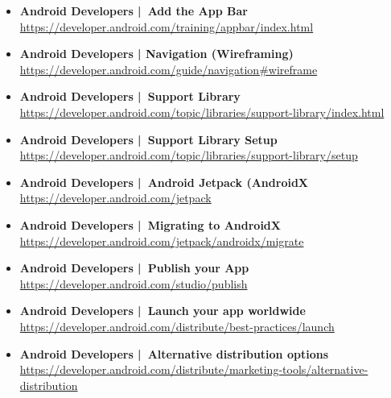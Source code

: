 \documentclass[a4paper]{article}
\begin{document}
\begin{itemize}
		\item \textbf{Android Developers | Add the App Bar}\\
		\href{https://developer.android.com/training/appbar/index.html}
		{https://developer.android.com/training/appbar/index.html}
		
		\item \textbf{Android Developers | Navigation (Wireframing)}\\
		\href{https://developer.android.com/guide/navigation#wireframe}
		{https://developer.android.com/guide/navigation\#wireframe}
		
		\item \textbf{Android Developers | Support Library}\\
		\href{https://developer.android.com/topic/libraries/support-library/index.html}
		{https://developer.android.com/topic/libraries/support-library/index.html}
		
		\item \textbf{Android Developers | Support Library Setup}\\
		\href{https://developer.android.com/topic/libraries/support-library/setup}
		{https://developer.android.com/topic/libraries/support-library/setup}
		
		\item \textbf{Android Developers | Android Jetpack (AndroidX}\\
		\href{https://developer.android.com/jetpack}
		{https://developer.android.com/jetpack}
		
		\item \textbf{Android Developers | Migrating to AndroidX}\\
		\href{https://developer.android.com/jetpack/androidx/migrate}
		{https://developer.android.com/jetpack/androidx/migrate}
		
		\item \textbf{Android Developers | Publish your App}\\
		\href{https://developer.android.com/studio/publish}
		{https://developer.android.com/studio/publish}
		
		\item \textbf{Android Developers | Launch your app worldwide}\\
		\href{https://developer.android.com/distribute/best-practices/launch}
		{https://developer.android.com/distribute/best-practices/launch}
		
		\item \textbf{Android Developers | Alternative distribution options}\\
		\href{https://developer.android.com/distribute/marketing-tools/alternative-distribution}
		{https://developer.android.com/distribute/marketing-tools/alternative-distribution}
		

\end{itemize}
\end{document}
